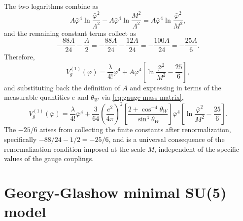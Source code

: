 The two logarithms combine as
\begin{equation}
	A\bar\varphi^4\ln\frac{\bar\varphi^2}{\Lambda^2}
	- A\bar\varphi^4\ln\frac{M^2}{\Lambda^2}
	= A\bar\varphi^4\ln\frac{\bar\varphi^2}{M^2},
\end{equation}
and the remaining constant terms collect as
\begin{equation}
	-\frac{88A}{24} - \frac{A}{2}
	= -\frac{88A}{24} - \frac{12A}{24}
	= -\frac{100A}{24}
	= -\frac{25A}{6}.
\end{equation}
Therefore,
\begin{equation}
	V_g^{(1)}(\bar\varphi) = \frac{\lambda}{4!}\bar\varphi^4
	+ A\bar\varphi^4\left[\ln\frac{\bar\varphi^2}{M^2}
		- \frac{25}{6}\right],
\end{equation}
and substituting back the definition of $A$ and expressing in terms of
the measurable quantities $e$ and $\theta_W$ via
\eqref{eq:gauge-mass-matrix},
\begin{equation}
	\boxed{V_g^{(1)}(\bar\varphi) = \frac{\lambda}{4!}\bar\varphi^4
		+ \frac{3}{64}\left(\frac{e^2}{4\pi}\right)^2
		\left[\frac{2+\cos^{-4}\theta_W}{\sin^4\theta_W}\right]
		\bar\varphi^4\left[\ln\frac{\bar\varphi^2}{M^2}
			- \frac{25}{6}\right].}
\end{equation}
The $-25/6$ arises from collecting the finite constants after
renormalization, specifically $-88/24 - 1/2 = -25/6$, and is a
universal consequence of the renormalization condition imposed at the
scale $M$, independent of the specific values of the gauge couplings.


\section{Georgy-Glashow minimal SU(5) model}






